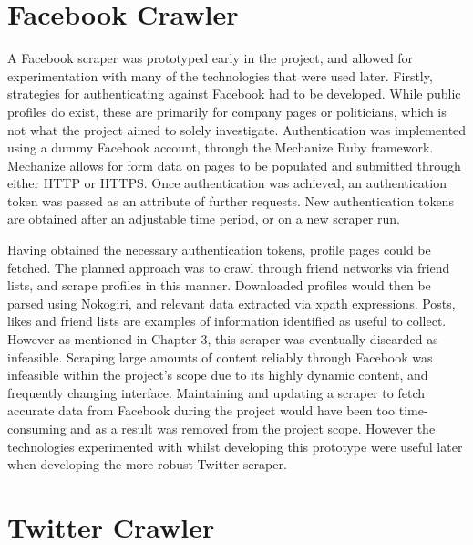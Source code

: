 
\section{Facebook Crawler}

A Facebook scraper was prototyped early in the project, and allowed for experimentation with many of the technologies that were used later. Firstly, strategies for authenticating against Facebook had to be developed. While public profiles do exist, these are primarily for company pages or politicians, which is not what the project aimed to solely investigate. Authentication was implemented using a dummy Facebook account, through the Mechanize Ruby framework. Mechanize allows for form data on pages to be populated and submitted through either HTTP or HTTPS. Once authentication was achieved, an authentication token was passed as an attribute of further requests. New authentication tokens are obtained after an adjustable time period, or on a new scraper run. 

Having obtained the necessary authentication tokens, profile pages could be fetched. The planned approach was to crawl through friend networks via friend lists, and scrape profiles in this manner. Downloaded profiles would then be parsed using Nokogiri, and relevant data extracted via xpath expressions. Posts, likes and friend lists are examples of information identified as useful to collect. However as mentioned in Chapter 3, this scraper was eventually discarded as infeasible. Scraping large amounts of content reliably through Facebook was infeasible within the project's scope due to its highly dynamic content, and frequently changing interface. Maintaining and updating a scraper to fetch accurate data from Facebook during the project would have been too time-consuming and as a result was removed from the project scope. However the technologies experimented with whilst developing this prototype were useful later when developing the more robust Twitter scraper.


\section{Twitter Crawler}

